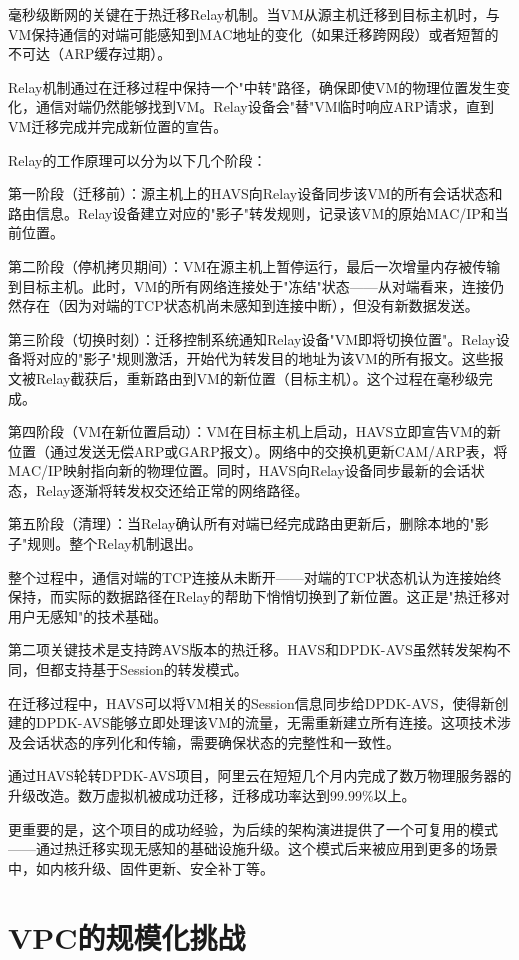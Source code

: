 毫秒级断网的关键在于热迁移Relay机制。当VM从源主机迁移到目标主机时，与VM保持通信的对端可能感知到MAC地址的变化（如果迁移跨网段）或者短暂的不可达（ARP缓存过期）。

Relay机制通过在迁移过程中保持一个"中转"路径，确保即使VM的物理位置发生变化，通信对端仍然能够找到VM。Relay设备会"替"VM临时响应ARP请求，直到VM迁移完成并完成新位置的宣告。

Relay的工作原理可以分为以下几个阶段：

第一阶段（迁移前）：源主机上的HAVS向Relay设备同步该VM的所有会话状态和路由信息。Relay设备建立对应的"影子"转发规则，记录该VM的原始MAC/IP和当前位置。

第二阶段（停机拷贝期间）：VM在源主机上暂停运行，最后一次增量内存被传输到目标主机。此时，VM的所有网络连接处于"冻结"状态——从对端看来，连接仍然存在（因为对端的TCP状态机尚未感知到连接中断），但没有新数据发送。

第三阶段（切换时刻）：迁移控制系统通知Relay设备"VM即将切换位置"。Relay设备将对应的"影子"规则激活，开始代为转发目的地址为该VM的所有报文。这些报文被Relay截获后，重新路由到VM的新位置（目标主机）。这个过程在毫秒级完成。

第四阶段（VM在新位置启动）：VM在目标主机上启动，HAVS立即宣告VM的新位置（通过发送无偿ARP或GARP报文）。网络中的交换机更新CAM/ARP表，将MAC/IP映射指向新的物理位置。同时，HAVS向Relay设备同步最新的会话状态，Relay逐渐将转发权交还给正常的网络路径。

第五阶段（清理）：当Relay确认所有对端已经完成路由更新后，删除本地的"影子"规则。整个Relay机制退出。

整个过程中，通信对端的TCP连接从未断开——对端的TCP状态机认为连接始终保持，而实际的数据路径在Relay的帮助下悄悄切换到了新位置。这正是"热迁移对用户无感知"的技术基础。

第二项关键技术是支持跨AVS版本的热迁移。HAVS和DPDK-AVS虽然转发架构不同，但都支持基于Session的转发模式。

在迁移过程中，HAVS可以将VM相关的Session信息同步给DPDK-AVS，使得新创建的DPDK-AVS能够立即处理该VM的流量，无需重新建立所有连接。这项技术涉及会话状态的序列化和传输，需要确保状态的完整性和一致性。

通过HAVS轮转DPDK-AVS项目，阿里云在短短几个月内完成了数万物理服务器的升级改造。数万虚拟机被成功迁移，迁移成功率达到99.99\%以上。

更重要的是，这个项目的成功经验，为后续的架构演进提供了一个可复用的模式——通过热迁移实现无感知的基础设施升级。这个模式后来被应用到更多的场景中，如内核升级、固件更新、安全补丁等。

\section{VPC的规模化挑战}

